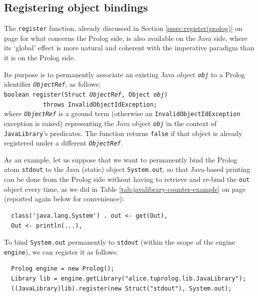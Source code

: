 \subsection{Registering object bindings}
\label{ssec:register(Java)}

The \texttt{register} function, already discussed in Section \ref{sssec:register(prolog)} on page \pageref{sssec:register(prolog)} for what concerns the Prolog side, is also available on the Java side, where its `global' effect is more natural and coherent with the imperative paradigm than it is on the Prolog side.

Its purpose is to permanently associate an existing Java object \texttt{\textit{obj}} to a Prolog identifier \texttt{\textit{ObjectRef}}, as follows:\\

\texttt{boolean register(Struct \textit{ObjectRef}, Object \textit{obj})\\
    \mbox{~~~~~~~~~~~}throws InvalidObjectIdException;}\\

\noindent where \texttt{\textit{ObjectRef}} is a ground term (otherwise an \texttt{InvalidObjectIdException} exception is raised) representing the Java object
\texttt{\textit{obj}} in the context of \texttt{JavaLibrary}'s predicates.
The function returns \texttt{false} if that object is already registered under a different \texttt{\textit{ObjectRef}}.

As an example, let us suppose that we want to permanently bind the Prolog atom \texttt{stdout} to the Java (static) object \texttt{System.out}, so that Java-based printing can be done from the Prolog side without having to retrieve and re-bind the \texttt{out} object every time, as we did in Table \ref{tab:javalibrary-counter-example} on page \pageref{tab:javalibrary-counter-example} (reported again below for convenience):

\begin{verbatim}
  class('java.lang.System') . out <- get(Out),
  Out <- println(...),
\end{verbatim}

\noindent To bind \texttt{System.out} permanently to \texttt{stdout} (within the scope of the \tuprolog{} engine \texttt{engine}), we can register it as follows:

{\small
\begin{verbatim}
  Prolog engine = new Prolog();
  Library lib = engine.getLibrary("alice.tuprolog.lib.JavaLibrary");
  ((JavaLibrary)lib).register(new Struct("stdout"), System.out);
\end{verbatim}}

